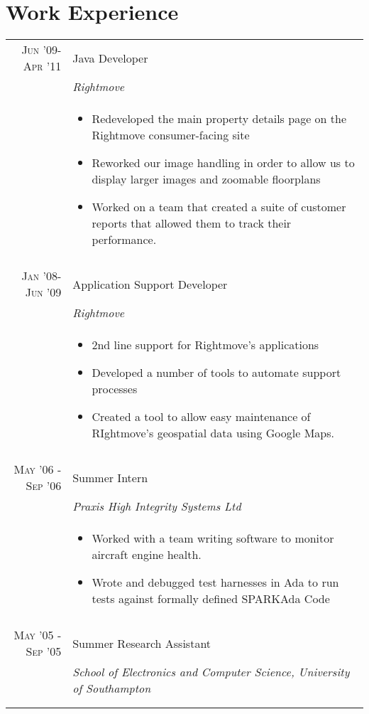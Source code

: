 \documentclass[a4paper,10pt]{article}
\begin{document}
\section{Work Experience}
\begin{tabular}{r|p{10.5cm}}
\textsc{Jun '09-Apr '11} & Java Developer \\&\emph{Rightmove}\\&
\begin{itemize}[noitemsep]
\item Redeveloped the main property details page on the Rightmove consumer-facing site
\item Reworked our image handling in order to allow us to display larger images and zoomable floorplans
\item Worked on a team that created a suite of customer reports that allowed them to track their performance.
\end{itemize} 
\\\multicolumn{2}{c}{} \\
\textsc{Jan '08-Jun '09} & Application Support Developer \\&\emph{Rightmove}\\&
\begin{itemize}[noitemsep]
\item 2nd line support for Rightmove's applications
\item Developed a number of tools to automate support processes
\item Created a tool to allow easy maintenance of RIghtmove's geospatial data using Google Maps.
\end{itemize} 
\\\multicolumn{2}{c}{} \\
\textsc{May '06 - Sep '06} & Summer Intern \\&\emph{Praxis High Integrity Systems Ltd}\\&
\begin{itemize}[noitemsep]
\item Worked with a team writing software to monitor aircraft engine health.
\item Wrote and debugged test harnesses in Ada to run tests against formally defined SPARKAda Code
\end{itemize} 
\\\multicolumn{2}{c}{} \\
\textsc{May '05 - Sep '05} & Summer Research Assistant \\&\emph{School of Electronics and Computer Science, University of Southampton}\\&
\\\multicolumn{2}{c}{} \\
\end{tabular}
\end{document}
